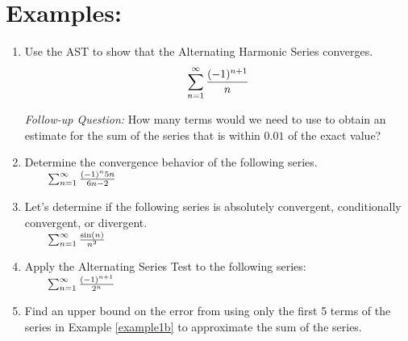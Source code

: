 

\pagebreak

\section*{Examples:}
\begin{enumerate}[{Example} 1:]



\item Use the AST to show that the Alternating Harmonic Series converges.
\[\sum_{n=1}^\infty \frac{(-1)^{n+1}}{n}\]

\vfill

\hspace*{-.75in} \textit{Follow-up Question:} How many terms would we need to use to obtain an estimate for the sum of the series that is within \(0.01\) of the exact value?

\vfill

\item Determine the convergence behavior of the following series.\\
\( \qquad
\sum_{n=1}^\infty \frac{(-1)^n 5n}{6n-2}
\)


\vfill

\pagebreak

\item Let's determine if the following series is absolutely convergent, conditionally convergent, or divergent.\\%
\(\qquad\sum_{n=1}^\infty \frac{\sin(n)}{n^2}\) %


\vfill

\item Apply the Alternating Series Test to the following series:\\
\( \qquad  \sum_{n=1}^\infty	\frac{(-1)^{n+1}}{2^{n}}\)\label{example1b}
\vfill

\item Find an upper bound on the error from using only the first 5 terms of the series in Example \ref{example1b} to approximate the sum of the series. 

\vfill




\end{enumerate}

